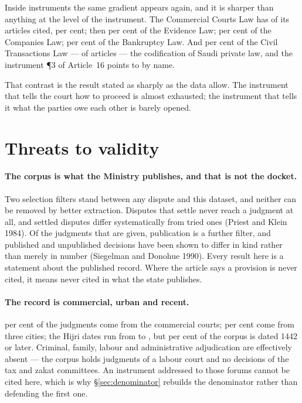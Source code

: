 \documentclass[11pt]{article}
\begin{document}
Inside instruments the same gradient appears again, and it is sharper than
anything at the level of the instrument. The Commercial Courts Law has \nCCLCited{} of its
\nCCLArticles{} articles cited, \nCCLShare{} per cent; then
\nEvidenceShare{} per cent of the Evidence Law;
\nCompaniesShare{} per cent of the Companies Law; \nBankruptcyShare{} per
cent of the Bankruptcy Law. And \nCivilShare{} per cent of the Civil
Transactions Law --- \nCivilCited{} of \nCivilArticles{} articles --- the
codification of Saudi private law, and the instrument \P3 of Article~16
points to by name.

That contrast is the result stated as sharply as the data allow. The
instrument that tells the court how to proceed is almost exhausted; the
instrument that tells it what the parties owe each other is barely opened.

\section{Threats to validity}
\label{sec:threats}

\paragraph{The corpus is what the Ministry publishes, and that is not the
docket.} Two selection filters stand between any dispute and this dataset,
and neither can be removed by better extraction. Disputes that settle never
reach a judgment at all, and settled disputes differ systematically from
tried ones (Priest and Klein 1984). Of the judgments that are given,
publication is a further filter, and published and unpublished decisions have
been shown to differ in kind rather than merely in number (Siegelman and
Donohue 1990). Every result here is a statement about the published record.
Where the article says a provision is never cited, it means never cited in
what the state publishes.

\paragraph{The record is commercial, urban and recent.}
\nCommercialShare{} per cent of the judgments come from the commercial
courts; \nTopCitiesShare{} per cent come from three cities; the Hijri dates
run from \nFirstYear{} to \nLastYear{}, but \nRecentShare{} per cent of the
corpus is dated 1442 or later. Criminal, family, labour and administrative
adjudication are effectively absent --- the corpus holds \nLabourJudgments{}
judgments of a labour court and no decisions of the tax and zakat
committees. An instrument
addressed to those forums cannot be cited here, which is why
§\ref{sec:denominator} rebuilds the denominator rather than defending the
first one.
\end{document}
